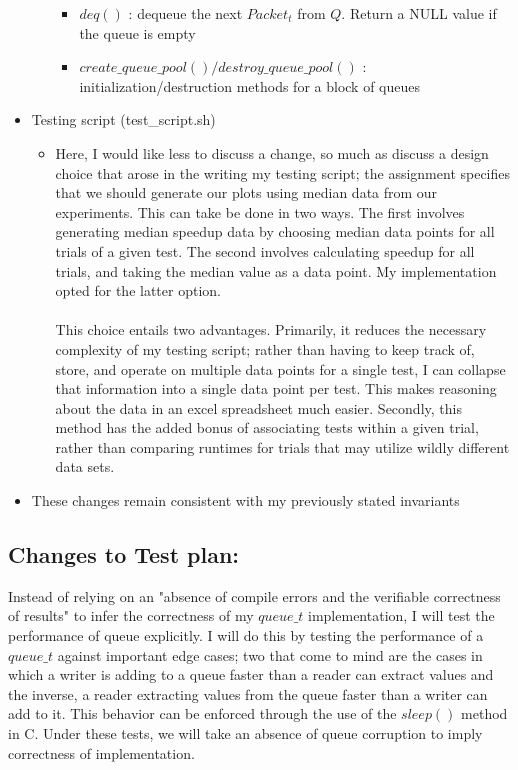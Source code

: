 \documentclass[]{article}
\begin{document}
\begin{itemize}
\begin{itemize}
\begin{itemize}
			\item $deq()$ : dequeue the next $Packet_t$ from $Q$. Return a NULL value if the queue is empty
			\item $create\_queue\_pool()/destroy\_queue\_pool()$ : initialization/destruction methods for a block of queues
		\end{itemize}
	\end{itemize}
	\item Testing script (test\_script.sh)
	\begin{itemize}
		\item Here, I would like less to discuss a change, so much as discuss a design choice that arose in the writing my testing script; the assignment specifies that we should generate our plots using median data from our experiments. This can take be done in two ways. The first involves generating median speedup data by choosing median data points for all trials of a given test. The second involves calculating speedup for all trials, and taking the median value as a data point. My implementation opted for the latter option.
		\\\\
		This choice entails two advantages. Primarily, it reduces the necessary complexity of my testing script; rather than having to keep track of, store, and operate on multiple data points for a single test, I can collapse that information into a single data point per test. This makes reasoning about the data in an excel spreadsheet much easier. Secondly, this method has the added bonus of associating tests within a given trial, rather than comparing runtimes for trials that may utilize wildly different data sets.
	\end{itemize}
	\item These changes remain consistent with my previously stated invariants
\end{itemize}

\subsection{Changes to Test plan:}
Instead of relying on an "absence of compile errors and the verifiable correctness of results" to infer the correctness of my $queue\_t$ implementation, I will test the performance of queue explicitly. I will do this by testing the performance of a $queue\_t$ against important edge cases; two that come to mind are the cases in which a writer is adding to a queue faster than a reader can extract values and the inverse, a reader extracting values from the queue faster than a writer can add to it. This behavior can be enforced through the use of the $sleep()$ method in C. Under these tests, we will take an absence of queue corruption to imply correctness of implementation.
\end{document}
